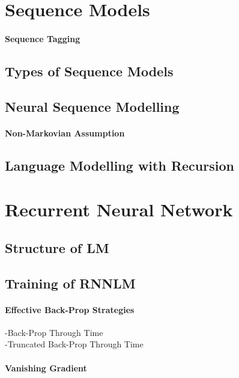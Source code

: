 		\section{Sequence Models}

			\paragraph*{Sequence Tagging}

			\subsection{Types of Sequence Models}

			\subsection{Neural Sequence Modelling}

				\paragraph*{Non-Markovian Assumption}

			\subsection{Language Modelling with Recursion}

		\section{Recurrent Neural Network}
			\subsection{Structure of LM}

			\subsection{Training of RNNLM}

				\paragraph*{Effective Back-Prop Strategies}

					-Back-Prop Through Time\\
					-Truncated Back-Prop Through Time

				\paragraph*{Vanishing Gradient}

